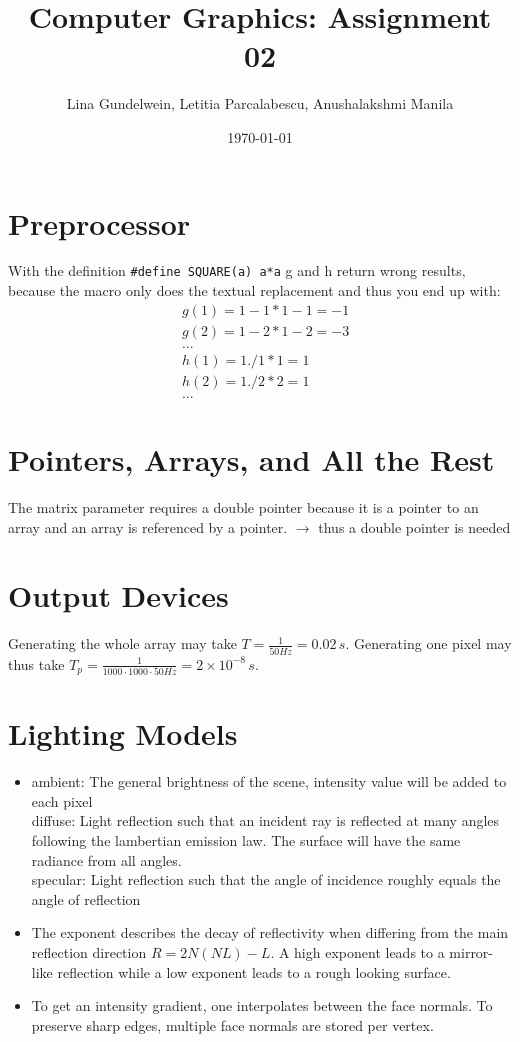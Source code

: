 \documentclass{article}
\title{Computer Graphics: Assignment 02} %
\author{Lina Gundelwein, Letitia Parcalabescu, Anushalakshmi Manila} %
\date{\today} %
\begin{document}
\maketitle 

\section{Preprocessor} 
With the definition \verb|#define SQUARE(a) a*a| g and h return wrong results, because the macro only does the textual replacement and thus you end up with:
\begin{align*}
&g(1) = 1-1*1-1 = -1\\
&g(2) = 1-2*1-2 = -3\\
&...\\
&h(1) = 1./1*1 = 1\\
&h(2) = 1./2*2 = 1\\
&...
\end{align*}

\section{Pointers, Arrays, and All the Rest}
The matrix parameter requires a double pointer because it is a pointer to an array and an array is referenced by a pointer. $\rightarrow$ thus a double pointer is needed


\section{Output Devices}
Generating the whole array may take $T = \frac{1}{50Hz} = 0.02\,s$. Generating one pixel may thus take $ T_p = \frac{1}{1000 \cdot 1000 \cdot 50Hz} = 2\times 10^{-8}\,s$.

\section{Lighting Models}
\begin{itemize}
\item ambient: The general brightness of the scene, intensity value will be added to each pixel
\\diffuse: Light reflection such that an incident ray is reflected at many angles following the lambertian emission law. The surface will have the same radiance from all angles.
\\specular:  Light reflection such that the angle of incidence roughly equals the angle of reflection
\item The exponent describes the decay of reflectivity when differing from the main reflection direction $R=2N(NL)-L$. A high exponent leads to a mirror-like reflection while a low exponent leads to a rough looking surface.
\item To get an intensity gradient, one interpolates between the face normals. To preserve sharp edges, multiple face normals are stored per vertex.
\end{itemize}
\end{document}
